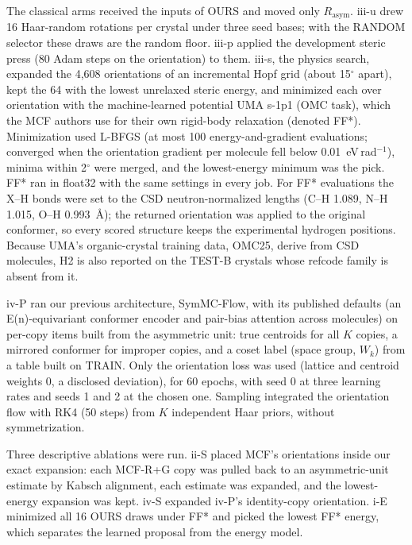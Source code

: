 The classical arms received the inputs of OURS and moved only
$R_{\mathrm{asym}}$. iii-u drew 16 Haar-random rotations per crystal under three
seed bases; with the RANDOM selector these draws are the random floor. iii-p
applied the development steric press (80 Adam steps on the orientation) to them.
iii-s, the physics search, expanded the 4,608 orientations of an incremental Hopf
grid (about 15$^\circ$ apart)\cite{yershova2010hopf,gorski2005healpix}, kept the 64 with
the lowest unrelaxed steric energy, and minimized each over orientation with the
machine-learned potential UMA s-1p1 (OMC task)\cite{wood2025uma,fairchem2026core}, which
the MCF authors use for their own rigid-body relaxation\cite{zeng2026molcrystalflow}
(denoted FF*). Minimization used
L-BFGS\cite{liu1989lbfgs}
(at most 100 energy-and-gradient evaluations; converged when the orientation
gradient per molecule fell below 0.01~eV\,rad$^{-1}$), minima within 2$^\circ$
were merged, and the lowest-energy minimum was the pick. FF* ran in float32 with
the same settings in every job. For FF* evaluations the X--H bonds were set to the
CSD neutron-normalized lengths (C--H 1.089, N--H 1.015, O--H
0.993~\AA)\cite{allen2010xh}; the returned orientation was
applied to the original conformer, so every scored structure keeps the
experimental hydrogen positions. Because UMA's organic-crystal training data, OMC25, derive from
CSD molecules\cite{gharakhanyan2026omc25,stuke2020oe62}, H2 is also reported on the TEST-B crystals whose
refcode family is absent from it.

iv-P ran our previous architecture, SymMC-Flow\cite{cai2026symmcflow}, with its
published defaults (an E(n)-equivariant conformer encoder\cite{satorras2021egnn}
and pair-bias attention across molecules) on per-copy items built from the
asymmetric unit: true centroids for all $K$ copies, a mirrored conformer for
improper copies, and a coset label (space group, $W_k$) from a table built on
TRAIN. Only the orientation loss was used (lattice and centroid weights 0, a
disclosed deviation), for 60 epochs, with seed 0 at three learning rates and seeds
1 and 2 at the chosen one. Sampling integrated the orientation flow with RK4 (50
steps) from $K$ independent Haar priors, without symmetrization.

Three descriptive ablations were run. ii-S placed MCF's orientations inside our exact
expansion: each MCF-R+G copy was pulled back to an asymmetric-unit estimate by
Kabsch alignment\cite{kabsch1976solution,kabsch1978discussion}, each estimate was expanded, and the
lowest-energy expansion was kept. iv-S expanded iv-P's identity-copy orientation.
i-E minimized all 16 OURS draws under FF* and picked the lowest FF* energy, which
separates the learned proposal from the energy model.

